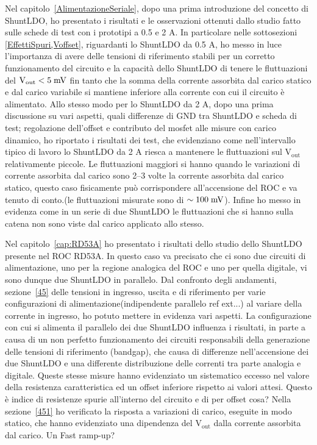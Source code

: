 Nel capitolo~\ref{AlimentazioneSeriale}, dopo una prima introduzione del concetto di ShuntLDO, ho presentato i risultati e le osservazioni ottenuti dallo studio fatto sulle schede di test con i prototipi a 0.5 e 2 A. 
In particolare nelle sottosezioni \ref{EffettiSpuri,Voffset}, riguardanti lo ShuntLDO da 0.5 A, ho messo in luce l'importanza di avere delle tensioni di riferimento stabili per un corretto funzionamento del circuito e la capacità dello ShuntLDO di tenere le fluttuazioni del $\mathrm{V_{out}<5 \rm \; mV}$ fin tanto che la somma della corrente assorbita dal carico statico e dal carico variabile si mantiene inferiore alla corrente con cui il circuito è alimentato. 
Allo stesso modo per lo ShuntLDO da 2 A, dopo una prima discussione su vari aspetti, quali differenze di GND tra ShuntLDO e scheda di test; regolazione dell'offset e contributo del mosfet alle misure con carico dinamico, ho riportato i risultati dei test, che evidenziano come nell'intervallo tipico di lavoro lo ShuntLDO da 2 A riesca a mantenere le fluttuazioni sul $\mathrm{V_{out}}$ relativamente piccole. 
Le fluttuazioni maggiori si hanno quando le variazioni di corrente assorbita dal carico sono 2--3 volte la corrente assorbita dal carico statico, questo caso fisicamente può corrispondere all'accensione del ROC e va tenuto di conto.(le fluttuazioni misurate sono di $\sim 100 \rm \; mV$). 
Infine ho messo in evidenza come in un serie di due ShuntLDO le fluttuazioni che si hanno sulla catena non sono viste dal carico applicato allo stesso.

Nel capitolo~\ref{cap:RD53A} ho presentato i risultati dello studio dello ShuntLDO presente nel ROC RD53A. In questo caso va precisato che ci sono due circuiti di alimentazione, uno per la regione analogica del ROC e uno per quella digitale, vi sono dunque due ShuntLDO in parallelo. 
Dal confronto degli andamenti, sezione~\ref{45} delle tensioni in ingresso, uscita e di riferimento per varie configurazioni di alimentazione(indipendente parallelo ref ext...) al variare della corrente in ingresso, ho potuto mettere in evidenza vari aspetti. 
La configurazione con cui si alimenta il parallelo dei due ShuntLDO influenza i risultati, in parte a causa di un non perfetto funzionamento dei circuiti responsabili della generazione delle tensioni di riferimento (bandgap), che causa di differenze nell'accensione dei due ShuntLDO e una differente distribuzione delle correnti tra parte analogia e digitale. 
Queste stesse misure hanno evidenziato un sistematico eccesso nel valore della resistenza caratteristica ed un offset inferiore  rispetto ai valori attesi. 
Questo è indice di resistenze spurie all'interno del circuito e di per offset cosa? 
Nella sezione~\ref{451} ho verificato la risposta a variazioni di carico, eseguite in modo statico, che hanno evidenziato una dipendenza del $\mathrm{V_{out}}$ dalla corrente assorbita dal carico. 
Un
Fast ramp-up?

